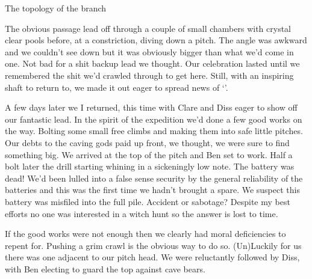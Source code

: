 \begin{survey}
\checkoddpage \ifoddpage \forcerectofloat \else \forceversofloat \fi
 \centering
{}
\caption[Fenestrator plan (grade 1)]{The topology of the  branch }
\end{survey}

The obvious passage lead off through a couple of small chambers with crystal clear pools before, at a constriction, diving down a pitch. The angle was awkward and we couldn't see down but it was obviously bigger than what we'd come in one. Not bad for a shit backup lead we thought. Our celebration lasted until we remembered the shit we'd crawled through to get here. Still, with an inspiring shaft to return to, we made it out eager to spread news of `'.

    
A few days later we I returned, this time with Clare and Diss eager to show off our fantastic lead. In the spirit of the expedition we'd done a few good works on the way. Bolting some small free climbs and making them into safe little pitches. Our debts to the caving gods paid up front, we thought, we were sure to find something big. We arrived at the top of the pitch and Ben set to work. Half a bolt later the drill starting whining in a sickeningly low note. The battery was dead! We'd been lulled into a false sense security by the general reliability of the batteries and this was the first time we hadn't brought a spare. We suspect this battery was misfiled into the full pile. Accident or sabotage? Despite my best efforts no one was interested in a witch hunt so the answer is lost to time.

If the good works were not enough then we clearly had moral deficiencies to repent for. Pushing a grim crawl is the obvious way to do so. (Un)Luckily for us there was one adjacent to our pitch head.  We were reluctantly followed by Diss, with Ben electing to guard the top against cave bears.

